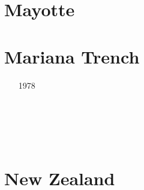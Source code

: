 \begin{small}
\begin{itemize}
\item[\twothousandtwenty]
\end{itemize}
\end{small}

\section{Mayotte}

\begin{small}
\begin{itemize}
\item[\twothousandtwentyfour]
\end{itemize}
\end{small}

\section{Mariana Trench}

\begin{small}
\begin{itemize}
\item[1978]
\item[\nineteenninetytwo]
\item[\twothousandfifteen]
\\
\\
\item[\twothousandeighteen]
\item[\twothousandtwentythree]
\\
\end{itemize}
\end{small}


\section{New Zealand} 

